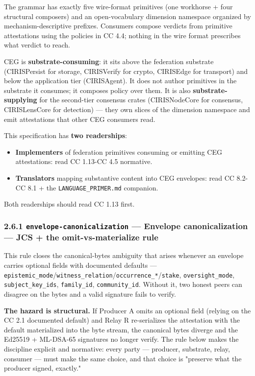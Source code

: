 \documentclass[11pt]{article}
\begin{document}
The grammar has exactly five wire-format primitives (one workhorse + four structural composers) and an open-vocabulary dimension namespace organized by mechanism-descriptive prefixes. Consumers compose verdicts from primitive attestations using the policies in CC 4.4; nothing in the wire format prescribes what verdict to reach.


CEG is \textbf{substrate-consuming}: it sits above the federation substrate (CIRISPersist for storage, CIRISVerify for crypto, CIRISEdge for transport) and below the application tier (CIRISAgent). It does not author primitives in the substrate it consumes; it composes policy over them. It is also \textbf{substrate-supplying} for the second-tier consensus crates (CIRISNodeCore for consensus, CIRISLensCore for detection) — they own slices of the dimension namespace and emit attestations that other CEG consumers read.


This specification has \textbf{two readerships}:

\begin{itemize}\setlength\itemsep{0pt}
\item \textbf{Implementers} of federation primitives consuming or emitting CEG attestations: read CC 1.13-CC 4.5 normative.
\item \textbf{Translators} mapping substantive content into CEG envelopes: read CC 8.2-CC 8.1 + the \texttt{LANGUAGE\_PRIMER.md} companion.
\end{itemize}


Both readerships should read CC 1.13 first.


\subsubsection*{2.6.1 \texttt{envelope-canonicalization} — Envelope canonicalization — JCS + the omit-vs-materialize rule}


This rule closes the canonical-bytes ambiguity that arises whenever an envelope carries optional fields with documented defaults — \texttt{epistemic\_mode}/\texttt{witness\_relation}/\texttt{occurrence\_*}/\texttt{stake}, \texttt{oversight\_mode}, \texttt{subject\_key\_ids}, \texttt{family\_id}, \texttt{community\_id}. Without it, two honest peers can disagree on the bytes and a valid signature fails to verify.


\textbf{The hazard is structural.} If Producer A omits an optional field (relying on the CC 2.1 documented default) and Relay R re-serializes the attestation with the default materialized into the byte stream, the canonical bytes diverge and the Ed25519 + ML-DSA-65 signatures no longer verify. The rule below makes the discipline explicit and normative: every party — producer, substrate, relay, consumer — must make the same choice, and that choice is "preserve what the producer signed, exactly."
\end{document}
